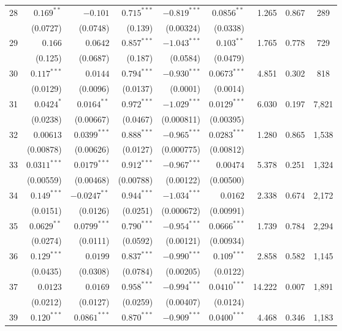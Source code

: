 \documentclass[11pt,a4paper]{article}
\begin{document}
\begin{landscape}
\begin{longtable}{crrrrrrrc}
28 & $0.169^{**}$ & $-0.101$ & $0.715^{***}$ & $-0.819^{***}$ & $0.0856^{**}$ & 1.265 & 0.867 & 289 \\
   & (0.0727) & (0.0748) & (0.139) & (0.00324) & (0.0338) & & & \\
29 & $0.166$ & $0.0642$ & $0.857^{***}$ & $-1.043^{***}$ & $0.103^{**}$ & 1.765 & 0.778 & 729 \\
   & (0.125) & (0.0687) & (0.187) & (0.0584) & (0.0479) & & & \\
30 & $0.117^{***}$ & $0.0144$ & $0.794^{***}$ & $-0.930^{***}$ & $0.0673^{***}$ & 4.851 & 0.302 & 818 \\
   & (0.0129) & (0.0096) & (0.0137) & (0.0001) & (0.0014) & & & \\
31 & $0.0424^{*}$ & $0.0164^{**}$ & $0.972^{***}$ & $-1.029^{***}$ & $0.0129^{***}$ & 6.030 & 0.197 & 7{,}821 \\
   & (0.0238) & (0.00667) & (0.0467) & (0.000811) & (0.00395) & & & \\
32 & $0.00613$ & $0.0399^{***}$ & $0.888^{***}$ & $-0.965^{***}$ & $0.0283^{***}$ & 1.280 & 0.865 & 1{,}538 \\
   & (0.00878) & (0.00626) & (0.0127) & (0.000775) & (0.00812) & & & \\
33 & $0.0311^{***}$ & $0.0179^{***}$ & $0.912^{***}$ & $-0.967^{***}$ & $0.00474$ & 5.378 & 0.251 & 1{,}324 \\
   & (0.00559) & (0.00468) & (0.00788) & (0.00122) & (0.00500) & & & \\
34 & $0.149^{***}$ & $-0.0247^{**}$ & $0.944^{***}$ & $-1.034^{***}$ & $0.0162$ & 2.338 & 0.674 & 2{,}172 \\
   & (0.0151) & (0.0126) & (0.0251) & (0.000672) & (0.00991) & & & \\
35 & $0.0629^{**}$ & $0.0799^{***}$ & $0.790^{***}$ & $-0.954^{***}$ & $0.0666^{***}$ & 1.739 & 0.784 & 2{,}294 \\
   & (0.0274) & (0.0111) & (0.0592) & (0.00121) & (0.00934) & & & \\
36 & $0.129^{***}$ & $0.0199$ & $0.837^{***}$ & $-0.990^{***}$ & $0.109^{***}$ & 2.858 & 0.582 & 1{,}145 \\
   & (0.0435) & (0.0308) & (0.0784) & (0.00205) & (0.0122) & & & \\
37 & $0.0123$ & $0.0169$ & $0.958^{***}$ & $-0.994^{***}$ & $0.0410^{***}$ & 14.222 & 0.007 & 1{,}891 \\
   & (0.0212) & (0.0127) & (0.0259) & (0.00407) & (0.0124) & & & \\
39 & $0.120^{***}$ & $0.0861^{***}$ & $0.870^{***}$ & $-0.909^{***}$ & $0.0400^{***}$ & 4.468 & 0.346 & 1{,}183 \\

\end{longtable}
\end{landscape}
\end{document}
